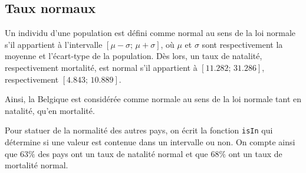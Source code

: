 \documentclass[a4paper, 12pt]{article}
\begin{document}
	\subsection{Taux normaux} \label{sec:Q1c}
	Un individu d'une population est défini comme normal au sens de la loi normale s'il appartient à l'intervalle $\left[\mu - \sigma;\, \mu + \sigma\right]$, où $\mu$ et $\sigma$ sont respectivement la moyenne et l'écart-type de la population. Dès lors, un taux de natalité, respectivement mortalité, est normal s'il appartient à $\left[\num{11.282};\, \num{31.286}\right]$, respectivement $\left[\num{4.843};\, \num{10.889}\right]$. \par
	Ainsi, la Belgique est considérée comme normale au sens de la loi normale tant en natalité, qu'en mortalité. \par
	Pour statuer de la normalité des autres pays, on écrit la fonction \texttt{isIn} qui détermine si une valeur est contenue dans un intervalle ou non. On compte ainsi que $63 \%$ des pays ont un taux de natalité normal et que $68 \%$ ont un taux de mortalité normal.
\end{document}
